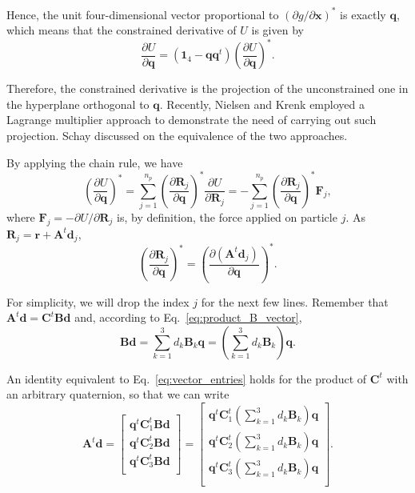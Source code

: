 \documentclass[aip,jcp,reprint,amsmath,amssymb,raggedbottom]{revtex4-1}
\newcommand{\mt}[1]{\boldsymbol{\mathbf{#1}}}           %
\newcommand{\vt}[1]{\boldsymbol{\mathbf{#1}}}           %
\newcommand{\tr}[1]{#1^t}                               %
\newcommand{\diff}[2]{\dfrac{\partial #1}{\partial #2}} %
\begin{document}
Hence, the unit four-dimensional vector proportional to $(\partial g/\partial \vt x)^\ast$ is exactly $\vt q$, which means that the constrained derivative of $U$ is given by
\begin{equation}
\label{eq:diff_projection}
\diff{U}{\vt q} = (\mt 1_4 - {\vt q}\tr{\vt q})\left( \diff{U}{\vt q} \right)^\ast.
\end{equation}

Therefore, the constrained derivative is the projection of the unconstrained one in the hyperplane orthogonal to $\vt q$. Recently, Nielsen and Krenk\cite{Nielsen2012} employed a Lagrange multiplier approach to demonstrate the need of carrying out such projection. Schay\cite{Schay1995, Schay1998} discussed on the equivalence of the two approaches.

By applying the chain rule, we have
\[
\left( \diff{U}{\vt q} \right)^\ast = \sum_{j=1}^{n_p} \left( \diff{\vt R_j}{\vt q} \right)^\ast \diff{U}{\vt R_j} = - \sum_{j=1}^{n_p} \left( \diff{\vt R_j}{\vt q} \right)^\ast {\vt F_j},
\]
where $\vt F_j = -\partial U/\partial \vt R_j$ is, by definition, the force applied on particle $j$. As $\vt R_j = \vt r + \tr{\mt A}\vt d_j$,
\[
\left( \diff{\vt R_j}{\vt q} \right)^\ast = \left( \diff{(\tr{\mt A}\vt d_j)}{\vt q} \right)^\ast.
\]

For simplicity, we will drop the index $j$ for the next few lines. Remember that $\tr{\mt A}\vt d = \tr{\mt C} \mt B\vt d$ and, according to Eq.~\ref{eq:product_B_vector},
\[
\mt B \vt d = \sum_{k=1}^3 d_k \mt B_k \vt q = \left( \sum_{k=1}^3 d_k \mt B_k \right) \vt q.
\]

An identity equivalent to Eq.~\ref{eq:vector_entries} holds for the product of $\tr{\mt C}$ with an arbitrary quaternion, so that we can write
\[
\tr{\mt A}{\vt d} =
\left[\begin{array}{c}
\tr{\vt q}\tr{\mt C}_1 \mt B \vt d \\
\tr{\vt q}\tr{\mt C}_2 \mt B \vt d \\
\tr{\vt q}\tr{\mt C}_3 \mt B \vt d \\
\end{array}\right] = 
\left[\begin{array}{c}
\tr{\vt q} \tr{\mt C}_1 \left( \sum_{k=1}^3 d_k \mt B_k \right) \vt q \\
\tr{\vt q} \tr{\mt C}_2 \left( \sum_{k=1}^3 d_k \mt B_k \right) \vt q \\
\tr{\vt q} \tr{\mt C}_3 \left( \sum_{k=1}^3 d_k \mt B_k \right) \vt q \\
\end{array}\right].
\]
\end{document}
